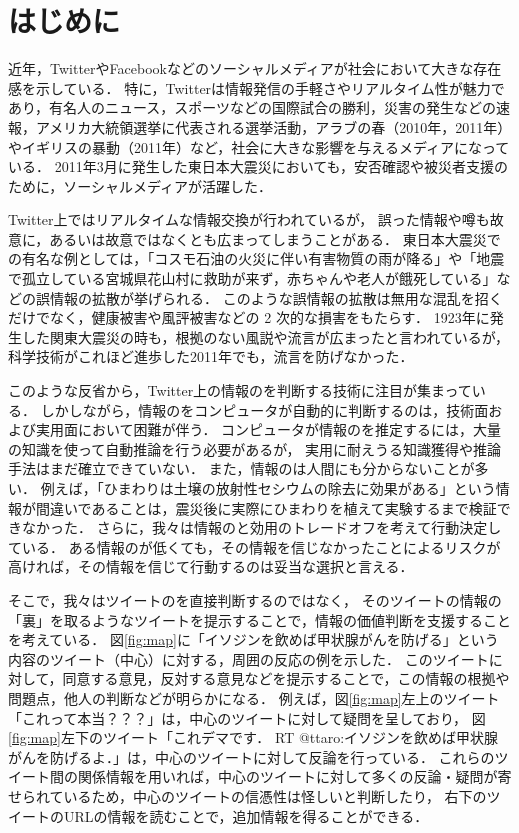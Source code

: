 \documentclass[japanese]{jnlp_1.4}
\newcommand{\addspan}[1]{}
\begin{document}
\maketitle


\section{はじめに}

近年，TwitterやFacebookなどのソーシャルメディアが社会において大きな存在感を示している．
特に，Twitterは情報発信の手軽さやリアルタイム性が魅力であり，有名人のニュース，スポーツなどの国際試合の勝利，災害の発生などの速報，アメリカ大統領選挙に代表される選挙活動，アラブの春（2010年，2011年）やイギリスの暴動（2011年）など，社会に大きな影響を与えるメディアになっている．
2011年3月に発生した東日本大震災においても，安否確認や被災者支援のために，ソーシャルメディアが活躍した．

Twitter上ではリアルタイムな情報交換が行われているが，
誤った情報や噂も故意に，あるいは故意ではなくとも広まってしまうことがある．
東日本大震災での有名な例としては，「コスモ石油の火災に伴い有害物質の雨が降る」や「地震で孤立している宮城県花山村に救助が来ず，赤ちゃんや老人が餓死している」などの誤情報の拡散が挙げられる．
このような誤情報の拡散は無用な混乱を招くだけでなく，健康被害や風評被害などの 2 次的な損害をもたらす．
1923年に発生した関東大震災の時も，根拠のない風説や流言が広まったと言われているが，科学技術がこれほど進歩した2011年でも，流言を防げなかった．

このような反省から，Twitter上の情報の\addspan{信憑性}を判断する技術に注目が集まっている．
しかしながら，情報の\addspan{信憑性}をコンピュータが自動的に判断するのは，技術面および実用面において困難が伴う．
コンピュータが情報の\addspan{信憑性}を推定するには，大量の知識を使って自動推論を行う必要があるが，
実用に耐えうる知識獲得や推論手法はまだ確立できていない．
また，情報の\addspan{信憑性}は人間にも分からないことが多い．
例えば，「ひまわりは土壌の放射性セシウムの除去に効果がある」という情報が間違いであることは，震災後に実際にひまわりを植えて実験するまで検証できなかった．
さらに，我々は情報の\addspan{信憑性}と効用のトレードオフを考えて行動決定している．
ある情報の\addspan{信憑性}が低くても，その情報を信じなかったことによるリスクが高ければ，その情報を信じて行動するのは妥当な選択と言える．

そこで，我々はツイートの\addspan{信憑性}を直接判断するのではなく，
そのツイートの情報の「裏」を取るようなツイートを提示することで，情報の価値判断を支援することを考えている．
図\ref{fig:map}に「イソジンを飲めば甲状腺がんを防げる」という内容のツイート（中心）に対する，周囲の反応の例を示した．
このツイートに対して，同意する意見，反対する意見などを提示することで，この情報の根拠や問題点，他人の判断などが明らかになる．
例えば，図\ref{fig:map}左上のツイート「これって本当？？？」は，中心のツイートに対して疑問を呈しており，
図\ref{fig:map}左下のツイート「これデマです． RT @ttaro:イソジンを飲めば甲状腺がんを防げるよ．」は，中心のツイートに対して反論を行っている．
これらのツイート間の関係情報を用いれば，中心のツイートに対して多くの反論・疑問が寄せられているため，中心のツイートの信憑性は怪しいと判断したり，
右下のツイートのURLの情報を読むことで，追加情報を得ることができる．
\end{document}
